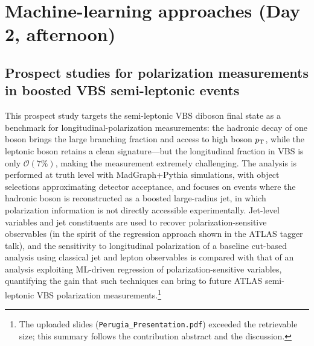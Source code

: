 \section{Machine-learning approaches (Day 2, afternoon)}

\subsection{Prospect studies for polarization measurements in boosted VBS semi-leptonic events}
This prospect study targets the semi-leptonic VBS diboson final state as a
benchmark for longitudinal-polarization measurements: the hadronic decay of one
boson brings the large branching fraction and access to high boson $p_{\mathrm{T}}$,
while the leptonic boson retains a clean signature---but the longitudinal
fraction in VBS is only $\mathcal{O}(7\%)$, making the measurement extremely
challenging. The analysis is performed at truth level with MadGraph+Pythia
simulations, with object selections approximating detector acceptance, and
focuses on events where the hadronic boson is reconstructed as a boosted
large-radius jet, in which polarization information is not directly accessible
experimentally. Jet-level variables and jet constituents are used to recover
polarization-sensitive observables (in the spirit of the regression approach
shown in the ATLAS tagger talk), and the sensitivity to longitudinal
polarization of a baseline cut-based analysis using classical jet and lepton
observables is compared with that of an analysis exploiting ML-driven
regression of polarization-sensitive variables, quantifying the gain that such
techniques can bring to future ATLAS semi-leptonic VBS polarization
measurements.\footnote{The uploaded slides
(\texttt{Perugia\_Presentation.pdf}) exceeded the retrievable size; this
summary follows the contribution abstract and the discussion.}

